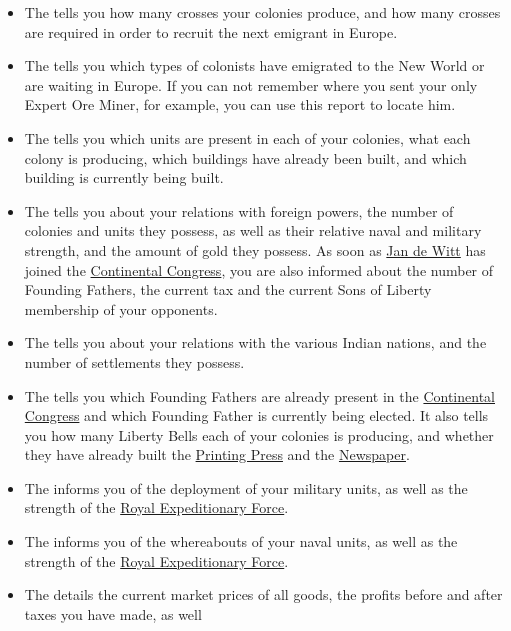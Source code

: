 \documentclass[12pt]{article}
\begin{document}
\begin{itemize}
\item The  tells you how many crosses your
colonies produce, and how many crosses are required in order to
recruit the next emigrant in Europe.
\item The  tells you which types of colonists
have emigrated to the New World or are waiting in Europe. If you can
not remember where you sent your only Expert Ore Miner, for example,
you can use this report to locate him.
\item The  tells you which units are present in
each of your colonies, what each colony is producing, which buildings
have already been built, and which building is currently being built.
\item The  tells you about your
  relations with foreign powers, the number of colonies and units they
  possess, as well as their relative naval and military strength, and
  the amount of gold they possess. As soon as \hyperlink{Jan de
    Witt}{Jan de Witt} has joined the \hyperlink{Continental
    Congress}{Continental Congress}, you are also informed about the
  number of Founding Fathers, the current tax and the current Sons of
  Liberty membership of your opponents.
\item The  tells you about your relations with
the various Indian nations, and the number of settlements they
possess.
\item The  tells you which
Founding Fathers are already present in the \hyperlink{Continental
Congress}{Continental Congress} and which Founding Father is currently
being elected. It also tells you how many Liberty Bells each of your
colonies is producing, and whether they have already built the
\hyperlink{Printing Press}{Printing Press} and the
\hyperlink{Newspaper}{Newspaper}.
\item The  informs you of the deployment of
your military units, as well as the strength of the \hyperlink{Royal
Expeditionary Force}{Royal Expeditionary Force}.
\item The  informs you of the whereabouts of
your naval units, as well as the strength of the \hyperlink{Royal
Expeditionary Force}{Royal Expeditionary Force}.
\item The  details the current market prices of
all goods, the profits before and after taxes you have made, as well

\end{itemize}
\end{document}
